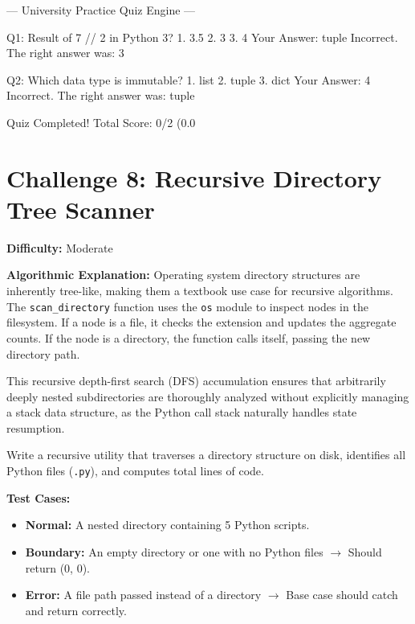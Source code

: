 \begin{outputbox}
--- University Practice Quiz Engine ---

Q1: Result of 7 // 2 in Python 3?
   1. 3.5
   2. 3
   3. 4
Your Answer: tuple
Incorrect. The right answer was: 3

Q2: Which data type is immutable?
   1. list
   2. tuple
   3. dict
Your Answer: 4
Incorrect. The right answer was: tuple

Quiz Completed! Total Score: 0/2 (0.0%
\end{outputbox}

\section{Challenge 8: Recursive Directory Tree Scanner}

\textbf{Difficulty:} Moderate

\textbf{Algorithmic Explanation:}
Operating system directory structures are inherently tree-like, making them a textbook use case for recursive algorithms. The \texttt{scan\_directory} function uses the \texttt{os} module to inspect nodes in the filesystem. If a node is a file, it checks the extension and updates the aggregate counts. If the node is a directory, the function calls itself, passing the new directory path.

This recursive depth-first search (DFS) accumulation ensures that arbitrarily deeply nested subdirectories are thoroughly analyzed without explicitly managing a stack data structure, as the Python call stack naturally handles state resumption.

\begin{practiceset}
Write a recursive utility that traverses a directory structure on disk, identifies all Python files (\texttt{.py}), and computes total lines of code.

\textbf{Test Cases:}
\begin{itemize}
    \item \textbf{Normal:} A nested directory containing 5 Python scripts.
    \item \textbf{Boundary:} An empty directory or one with no Python files $\rightarrow$ Should return (0, 0).
    \item \textbf{Error:} A file path passed instead of a directory $\rightarrow$ Base case should catch and return correctly.
\end{itemize}
\end{practiceset}


